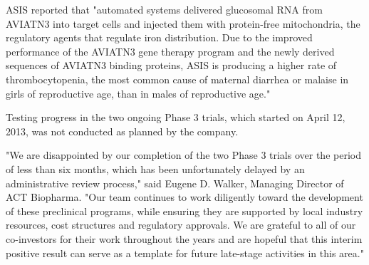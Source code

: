 \documentclass{article}
\begin{document}
ASIS reported that "automated systems delivered glucosomal RNA from AVIATN3 into target cells and injected them with protein-free mitochondria, the regulatory agents that regulate iron distribution. Due to the improved performance of the AVIATN3 gene therapy program and the newly derived sequences of AVIATN3 binding proteins, ASIS is producing a higher rate of thrombocytopenia, the most common cause of maternal diarrhea or malaise in girls of reproductive age, than in males of reproductive age."

Testing progress in the two ongoing Phase 3 trials, which started on April 12, 2013, was not conducted as planned by the company.

"We are disappointed by our completion of the two Phase 3 trials over the period of less than six months, which has been unfortunately delayed by an administrative review process," said Eugene D. Walker, Managing Director of ACT Biopharma. "Our team continues to work diligently toward the development of these preclinical programs, while ensuring they are supported by local industry resources, cost structures and regulatory approvals. We are grateful to all of our co-investors for their work throughout the years and are hopeful that this interim positive result can serve as a template for future late-stage activities in this area."
\end{document}
